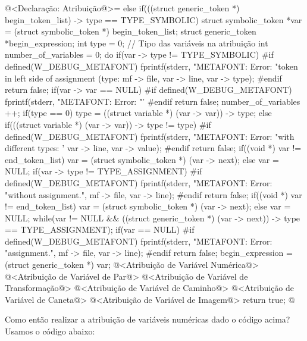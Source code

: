 \iniciocodigo
@<Declaração: Atribuição@>=
else if(((struct generic_token *) begin_token_list) -> type ==
        TYPE_SYMBOLIC){
  struct symbolic_token *var = (struct symbolic_token *) begin_token_list;
  struct generic_token *begin_expression;
  int type = 0; // Tipo das variáveis na atribuição
  int number_of_variables = 0;
  do{
    if(var -> type != TYPE_SYMBOLIC){
#if defined(W_DEBUG_METAFONT)
      fprintf(stderr, "METAFONT: Error: %
              "token in left side of assignment (type: %
              mf -> file,
              var -> line, var -> type);
#endif
      return false;
    }
    if(var -> var == NULL){
#if defined(W_DEBUG_METAFONT)
      fprintf(stderr, "METAFONT: Error: %
              "'%
#endif
      return false;
    }
    number_of_variables ++;
    if(type == 0)
      type = ((struct variable *) (var -> var)) -> type;
    else if(((struct variable *) (var -> var)) -> type != type){
#if defined(W_DEBUG_METAFONT)
      fprintf(stderr, "METAFONT: Error: %
              "with different types: '%
              var -> line, var -> value);
#endif
      return false;
    }
    if((void *) var != end_token_list)
      var = (struct symbolic_token *) (var -> next);
    else
      var = NULL;
    if(var -> type != TYPE_ASSIGNMENT){
#if defined(W_DEBUG_METAFONT)
      fprintf(stderr, "METAFONT: Error: %
              "without assignment.\n", mf -> file, var -> line);
#endif
      return false;
    }
    if((void *) var != end_token_list)
      var = (struct symbolic_token *) (var -> next);
    else
      var = NULL;
  } while(var != NULL &&
          ((struct generic_token *) (var -> next)) -> type ==
          TYPE_ASSIGNMENT);
  if(var == NULL){
#if defined(W_DEBUG_METAFONT)
      fprintf(stderr, "METAFONT: Error: %
              "assignment.\n", mf -> file, var -> line);
#endif
      return false;
  }
  begin_expression = (struct generic_token *) var;
  @<Atribuição de Variável Numérica@>
  @<Atribuição de Variável de Par@>
  @<Atribuição de Variável de Transformação@>
  @<Atribuição de Variável de Caminho@>
  @<Atribuição de Variável de Caneta@>
  @<Atribuição de Variável de Imagem@>
  return true;
}
@
\fimcodigo


Como então realizar a atribuição de variáveis numéricas dado o código
acima? Usamos o código abaixo:

